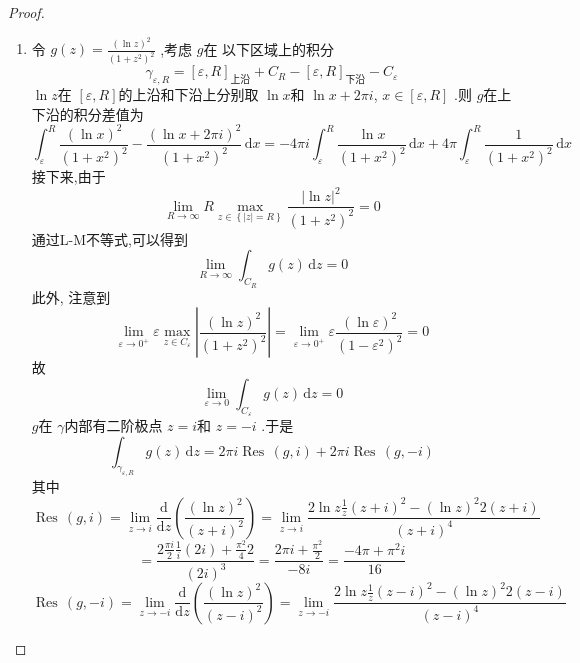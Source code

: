 \documentclass[../../复变函数.tex]{subfiles}
\begin{document}
\begin{proof}
    \begin{enumerate}
        \item 令 \(  g\left( z \right)= \frac{\left( \ln z \right)^{2}  }{\left( 1+ z^{2} \right)^{2}  }    \) ,考虑 \(  g  \)在 以下区域上的积分 \[
    \gamma_{ \varepsilon ,R} =  [ \varepsilon ,R ]_{\text{上沿}}+ C_{R}- [ \varepsilon ,R]_{\text{下沿}}-C_{ \varepsilon }
    \]  \(  \ln z  \)在 \(  [ \varepsilon ,R]  \)的上沿和下沿上分别取 \(  \ln x  \)和 \(  \ln x+ 2\pi i  \), \(  x\in \left[  \varepsilon ,R \right]   \) .则     \(  g  \)在上下沿的积分差值为 \[
    \int_{ \varepsilon }^{R}\frac{\left( \ln x \right)^{2}  }{\left( 1+ x^{2} \right)^{2}  }- \frac{\left( \ln x+ 2\pi i \right)^{2}  }{ \left( 1+ x^{2} \right)^{2} }\,\mathrm{d} x=  -4\pi i \int_{ \varepsilon }^{R}\frac{\ln x }{\left( 1+ x^{2} \right)^{2}  }\,\mathrm{d} x+ 4\pi  \int_{ \varepsilon }^{R}\frac{1 }{\left( 1+ x^{2} \right)^{2}  }\,\mathrm{d} x    
    \] 接下来,由于  \[
     \lim_{R\to \infty}  R\max _{z\in \left\{ \left| z \right|= R  \right\}}\frac{\left| \ln z \right|^{2}  }{\left( 1+ z^{2} \right)^{2}  }= 0 
    \]通过L-M不等式,可以得到 \[
    \lim_{R\to \infty} \int_{C_{R}}g\left( z \right)\,\mathrm{d} z= 0 
    \]此外, 注意到 \[
    \lim_{ \varepsilon \to 0^{+ }}  \varepsilon  \max _{z\in C_{ \varepsilon }}\left| \frac{\left( \ln z \right)^{2}  }{\left( 1+ z^{2} \right)^{2}  }  \right|=  \lim_{ \varepsilon \to 0^{+ }}  \varepsilon \frac{\left( \ln  \varepsilon  \right)^{2}  }{\left( 1- \varepsilon ^{2} \right)^{2}  } = 0
    \]故 \[
    \lim_{ \varepsilon \to 0} \int_{C_{ \varepsilon }}g\left( z \right)\,\mathrm{d} z= 0 
    \] \(  g  \)在 \(   \gamma   \)内部有二阶极点 \(  z= i  \)和 \(  z= -i  \)    .于是 \[
    \int_{ \gamma _{ \varepsilon ,R}}g\left( z \right)\,\mathrm{d} z= 2\pi i\operatorname{Res}\, \left( g,i \right)  + 2\pi i\operatorname{Res}\, \left( g,-i \right) 
    \]其中\[
    \operatorname{Res}\, \left( g,i \right)= \lim_{z\to i} \frac{\mathrm{d}}{\mathrm{d}z}\left( \frac{\left( \ln z \right)^{2}  }{\left( z+ i \right)^{2}  }  \right) = \lim_{z\to i}\frac{2\ln z\frac{1 }{z } \left( z+ i \right)^{2}-\left( \ln z \right)^{2}2\left( z+ i \right)   }{\left( z+ i \right)^{4}  } 
    \] \[
   = \frac{2 \frac{\pi i }{2 } \frac{1 }{i }\left( 2i \right)+ \frac{\pi ^{2} }{4 }2     }{ \left( 2i \right)^{3} }= \frac{2\pi i+ \frac{\pi ^{2} }{2 }  }{-8i }= \frac{-4\pi + \pi ^{2}i }{16 }  
    \] \[
    \operatorname{Res}\, \left( g,-i \right)= \lim_{z\to- i}\frac{\mathrm{d}}{\mathrm{d}z}\left( \frac{\left( \ln z \right)^{2}  }{\left( z-i \right)^{2}  }  \right)  = \lim_{z\to -i} \frac{2\ln z \frac{1 }{z }\left( z-i \right)^{2}-\left( \ln z \right)^{2}2\left( z-i \right)     }{ \left( z-i \right)^{4} } 
\]
\end{enumerate}
\end{proof}
\end{document}
